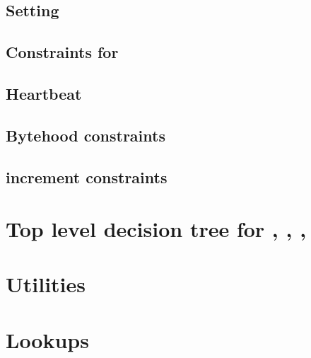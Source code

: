 \subsection{Setting \accInputs{}}                                           \label{bls: setting acc pairings}                               
\subsection{Constraints for \blsStamp{}}                                    \label{bls: stamp}                                              
\subsection{Heartbeat}                                                      \label{bls: heartbeat}                                          
\subsection{Bytehood constraints}                                           \label{bls: bytehood and accumulator}                           
\subsection{\blsId{} increment constraints}                                 \label{bls: stamp increments}                                   

\section{Top level decision tree for \malformedDataInternalTot{}, \malformedDataExternalTot{}, \wellformedDataTrivial{}, \wellformedDataNontrivial{}}     \label{bls: top level}                                          


\section{Utilities}                       \label{bls: utilities}                       
\section{Lookups}                         \label{bls: lookups}                         
